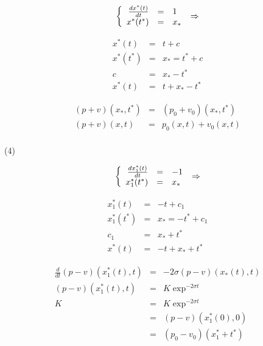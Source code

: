 \documentclass[a4paper,11pt]{article}
\begin{document}
\begin{equation*}
\left\{
\begin{array}{rcl}
    \frac{dx^{*}(t)}{dt} &=& 1 \\
    x^{*}(t^{*}) &=& x_{*}
\end{array}
\right. \\
\Rightarrow
\end{equation*}

\begin{equation*}
\begin{array}{rcl}
x^{*}(t) &=& t +c \\
x^{*}(t^{*}) &=& x_{*} = t^{*}+c \\
c &=& x_{*}-t^{*} \\
x^{*}(t) &=& t + x_{*}-t^{*}
\end{array}
\end{equation*}

\begin{equation*}
\begin{array}{rcl}
    (p+v)(x_{*},t^{*}) &=& (p_{0}+v_{0})(x_{*},t^{*}) \\
    (p+v)(x,t) &=& p_{0}(x,t) + v_{0}(x,t)\\
\end{array}
\end{equation*}

(4)

\begin{equation*}
\left\{
\begin{array}{rcl}
    \frac{dx_{1}^{*}(t)}{dt} &=& -1 \\
    x_{1}^{*}(t^{*}) &=& x_{*}
\end{array}
\right. \\
\Rightarrow
\end{equation*}

\begin{equation*}
\begin{array}{rcl}
    x_{1}^{*}(t) &=& -t +c_{1} \\
    x_{1}^{*}(t^{*}) &=& x_{*} = -t^{*}+c_{1} \\
    c_{1} &=& x_{*} + t^{*} \\
    x^{*}(t) &=& -t + x_{*} + t^{*}
\end{array}
\end{equation*}

\begin{equation*}
\begin{array}{rcl}
    \frac{d}{dt}(p-v)(x_{1}^{*}(t), t) &=& -2\sigma (p-v)(x_{*}(t), t) \\
    (p-v)(x_{1}^{*}(t), t) &=& K \exp^{-2\sigma t} \\
    K &=& K \exp^{-2\sigma t} \\
    &=& (p-v)(x_{1}^{*}(0), 0) \\
    &=& (p_{0}-v_{0})(x_{1}^{*} + t^{*})
\end{array}
\end{equation*}
\end{document}

